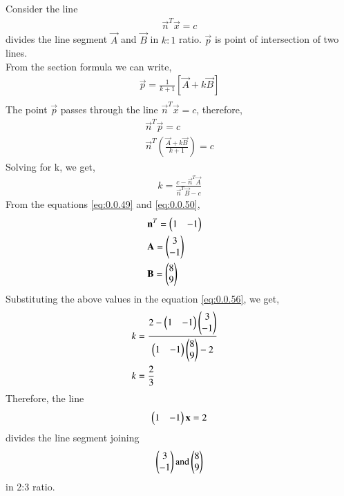 \documentclass[journal,12pt,twocolumn]{IEEEtran}
\begin{document}
\begin{enumerate}
\solution Consider the line \begin{align} \vec{n}^T\vec{x}=c \end{align} divides the line segment $\vec{A}$ and $\vec{B} $ in $k:1$ ratio.
$\vec{p} $ is point of intersection of two lines.\\ 
From the section formula we can write,
\begin{align}
&\vec{p} = \displaystyle\frac{1}{k+1}\left[\vec{A}+ k\vec{B}\right]&\\
 \end{align}
The point $\vec{p}$ passes through the line $\vec{n}^T\vec{x}=c$, therefore,
\begin{align}
&\vec{n}^T\vec{p}=c&\\
&\vec{n}^T\left(\displaystyle\frac{\vec{A}+k\vec{B}}{k+1} \right)=c&
\end{align}
Solving for k, we get,
\begin{align}
&k=\displaystyle\frac{c-\vec{n}^T\vec{A}}{\vec{n}^T\vec{B}-c} \label{eq:0.0.56} &
\end{align}
From the equations \eqref{eq:0.0.49} and \eqref{eq:0.0.50},
\begin{align}
& \mathbf{n}^T = \begin{pmatrix}1&-1\end{pmatrix}&\\
& \mathbf{A} = \begin{pmatrix}3 \\-1\end{pmatrix}&\\
& \mathbf{B} = \begin{pmatrix}8\\9\end{pmatrix}
\end{align}
Substituting the above values in the equation \eqref{eq:0.0.56}, we get,
\begin{align}
& k = \displaystyle\frac{2-\begin{pmatrix}1&-1\end{pmatrix}\begin{pmatrix}3\\-1\end{pmatrix}}{\begin{pmatrix}1&-1\end{pmatrix}\begin{pmatrix}8\\9\end{pmatrix} - 2}&\\
&k = \displaystyle\frac{2}{3}
\end{align}
Therefore, the line \begin{align} \begin{pmatrix}1&-1\end{pmatrix}\mathbf{x}=2 \end{align} divides the line segment joining \begin{align}\begin{pmatrix}3 \\-1\end{pmatrix} \text{and} \begin{pmatrix}8\\9\end{pmatrix} \end{align} in 2:3 ratio.
\end{enumerate}
\end{document}
